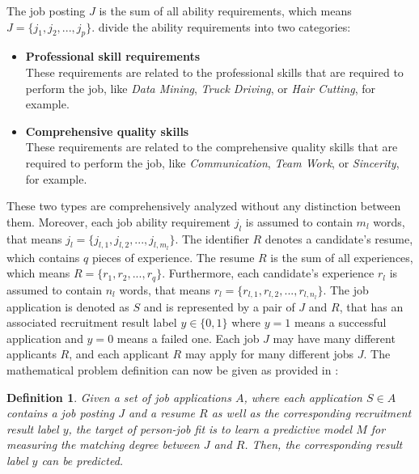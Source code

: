\documentclass[draft,final]{thesisclass} %
\newtheorem{definition}{Definition}
\begin{document}
The job posting $J$ is the sum of all ability requirements, which means $J = \{j_1,j_2,...,j_p\}$.
\textcite[7]{pj_fit_ml} divide the ability requirements into two categories:
\begin{itemize}
    \item \textbf{Professional skill requirements}\\
    These requirements are related to the professional skills that are required to perform the job, like \textit{Data Mining}, \textit{Truck Driving}, or \textit{Hair Cutting}, for example.
    \item \textbf{Comprehensive quality skills}\\
    These requirements are related to the comprehensive quality skills that are required to perform the job, like \textit{Communication}, \textit{Team Work}, or \textit{Sincerity}, for example.
\end{itemize}
These two types are comprehensively analyzed without any distinction between them.
Moreover, each job ability requirement $j_l$ is assumed to contain $m_l$ words, that means $j_l = \{j_{l,1},j_{l,2},...,j_{l,m_l}\}$.
The identifier $R$ denotes a candidate's resume, which contains $q$ pieces of experience.
The resume $R$ is the sum of all experiences, which means $R = \{r_1,r_2,...,r_q\}$.
Furthermore, each candidate's experience $r_l$ is assumed to contain $n_l$ words, that means $r_l = \{r_{l,1},r_{l,2},...,r_{l,n_l}\}$.
The job application is denoted as $S$ and is represented by a pair of $J$ and $R$, that has an associated recruitment result label $y \in \{0,1\}$ where $y = 1$ means a successful application and $y = 0$ means a failed one.
Each job $J$ may have many different applicants $R$, and each applicant $R$ may apply for many different jobs $J$.
The mathematical problem definition can now be given as provided in \textcite[8]{pj_fit_ml}:
\begin{definition}
    Given a set of job applications $A$, where each application $S \in A$ contains a job posting $J$ and a resume $R$ as well as the corresponding recruitment result label $y$, the target of person-job fit is to learn a predictive model $M$ for measuring the matching degree between $J$ and $R$. Then, the corresponding result label $y$ can be predicted.
\end{definition}
\end{document}
